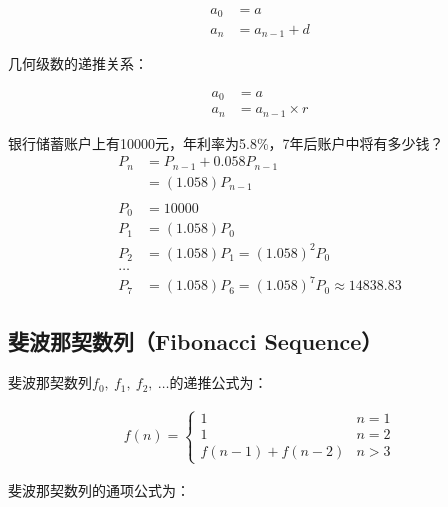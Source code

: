 \begin{align*}
	a_0 & = a           \\
	a_n & = a_{n-1} + d
\end{align*}

几何级数的递推关系：

\vspace{-1.5cm}

\begin{align*}
	a_0 & = a                \\
	a_n & = a_{n-1} \times r
\end{align*}

\begin{tcolorbox}
	银行储蓄账户上有10000元，年利率为5.8\%，7年后账户中将有多少钱？
	\begin{align*}
		P_n & = P_{n-1} + 0.058P_{n-1}                      \\
		    & = (1.058)P_{n-1}                              \\
		\\
		P_0 & = 10000                                       \\
		P_1 & = (1.058)P_0                                  \\
		P_2 & = (1.058)P_1 = (1.058)^2 P_0                  \\
		\dots                                               \\
		P_7 & = (1.058)P_6 = (1.058)^7 P_0 \approx 14838.83
	\end{align*}
\end{tcolorbox}

\vspace{0.5cm}

\subsection{斐波那契数列（Fibonacci Sequence）}

斐波那契数列$ f_0,\ f_1,\ f_2,\ \dots $的递推公式为：

\begin{align*}
	f(n) = \begin{cases}
		1               & n = 1 \\
		1               & n = 2 \\
		f(n-1) + f(n-2) & n > 3
	\end{cases}
\end{align*}

斐波那契数列的通项公式为：

